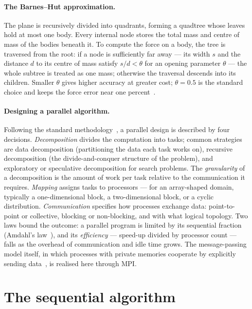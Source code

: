 \documentclass[11pt,a4paper]{article}
\begin{document}
\paragraph{The Barnes--Hut approximation.}
The plane is recursively divided into quadrants, forming a quadtree whose leaves
hold at most one body. Every internal node stores the total mass and centre of
mass of the bodies beneath it. To compute the force on a body, the tree is
traversed from the root: if a node is sufficiently far away --- its width $s$ and
the distance $d$ to its centre of mass satisfy $s/d<\theta$ for an opening
parameter $\theta$ --- the whole subtree is treated as one mass; otherwise the
traversal descends into its children. Smaller $\theta$ gives higher accuracy at
greater cost; $\theta=0.5$ is the standard choice and keeps the force error near
one percent~\cite{barnes1986}.

\paragraph{Designing a parallel algorithm.}
Following the standard methodology~\cite{grama2003,foster1995}, a parallel design
is described by four decisions. \emph{Decomposition} divides the computation into
tasks; common strategies are data decomposition (partitioning the data each task
works on), recursive decomposition (the divide-and-conquer structure of the
problem), and exploratory or speculative decomposition for search problems. The
\emph{granularity} of a decomposition is the amount of work per task relative to
the communication it requires. \emph{Mapping} assigns tasks to processors --- for
an array-shaped domain, typically a one-dimensional block, a two-dimensional
block, or a cyclic distribution. \emph{Communication} specifies how processes
exchange data: point-to-point or collective, blocking or non-blocking, and with
what logical topology. Two laws bound the outcome: a parallel program is limited
by its sequential fraction (Amdahl's law~\cite{amdahl1967}), and its
\emph{efficiency} --- speed-up divided by processor count --- falls as the
overhead of communication and idle time grows. The message-passing model itself,
in which processes with private memories cooperate by explicitly sending
data~\cite{quinn2004}, is realised here through MPI.

\section{The sequential algorithm}
\label{sec:serial}
\end{document}
